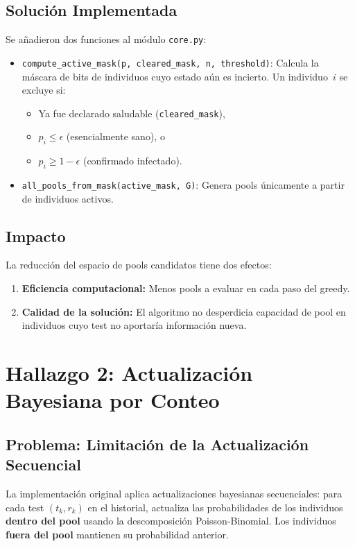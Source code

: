 \documentclass[11pt, a4paper]{article}
\begin{document}
\subsection{Soluci\'on Implementada}
Se a\~nadieron dos funciones al m\'odulo \texttt{core.py}:

\begin{itemize}[nosep]
    \item \texttt{compute\_active\_mask(p, cleared\_mask, n, threshold)}: Calcula
    la m\'ascara de bits de individuos cuyo estado a\'un es incierto.
    Un individuo~$i$ se excluye si:
    \begin{itemize}[nosep]
        \item Ya fue declarado saludable (\texttt{cleared\_mask}),
        \item $p_i \leq \epsilon$ (esencialmente sano), o
        \item $p_i \geq 1 - \epsilon$ (confirmado infectado).
    \end{itemize}
    \item \texttt{all\_pools\_from\_mask(active\_mask, G)}: Genera pools
    \'unicamente a partir de individuos activos.
\end{itemize}

\subsection{Impacto}
La reducci\'on del espacio de pools candidatos tiene dos efectos:
\begin{enumerate}[nosep]
    \item \textbf{Eficiencia computacional:} Menos pools a evaluar en cada paso
    del greedy.
    \item \textbf{Calidad de la soluci\'on:} El algoritmo no desperdicia
    capacidad de pool en individuos cuyo test no aportar\'ia informaci\'on nueva.
\end{enumerate}

\section{Hallazgo 2: Actualizaci\'on Bayesiana por Conteo}
\label{sec:counting}

\subsection{Problema: Limitaci\'on de la Actualizaci\'on Secuencial}
La implementaci\'on original aplica actualizaciones bayesianas secuenciales:
para cada test $(t_k, r_k)$ en el historial, actualiza las probabilidades
de los individuos \textbf{dentro del pool} usando la descomposici\'on
Poisson-Binomial. Los individuos \textbf{fuera del pool} mantienen su
probabilidad anterior.
\end{document}
